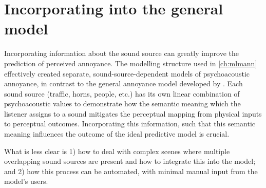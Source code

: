 \section{Incorporating into the general model}
Incorporating information about the sound source can greatly improve the prediction of perceived annoyance. The modelling structure used in \cref{ch:mlmann} effectively created separate, sound-source-dependent models of psychoacoustic annoyance, in contrast to the general annoyance model developed by \citet{PsychoacousticsfactsmodelsZwicker}. Each sound source (traffic, horns, people, etc.) has its own linear combination of psychoacoustic values to demonstrate how the semantic meaning which the listener assigns to a sound mitigates the perceptual mapping from physical inputs to perceptual outcomes. Incorporating this information, such that this semantic meaning influences the outcome of the ideal predictive model is crucial.

What is less clear is 1) how to deal with complex scenes where multiple overlapping sound sources are present and how to integrate this into the model; and 2) how this process can be automated, with minimal manual input from the model's users. %